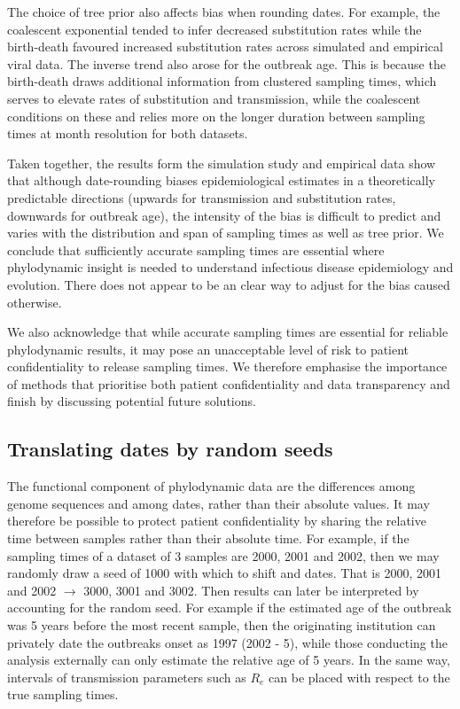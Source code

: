 \documentclass[12pt]{article}
\begin{document}
\begin{spacing}{2}
The choice of tree prior also affects bias when rounding dates. For example, the coalescent exponential tended to infer decreased substitution rates while the birth-death favoured increased substitution rates across simulated and empirical viral data. The inverse trend also arose for the outbreak age. This is because the birth-death draws additional information from clustered sampling times, which serves to elevate rates of substitution and transmission, while the coalescent conditions on these and relies more on the longer duration between sampling times at month resolution for both datasets. 

Taken together, the results form the simulation study and empirical data show that although date-rounding biases epidemiological estimates in a theoretically predictable directions (upwards for transmission and substitution rates, downwards for outbreak age), the intensity of the bias is difficult to predict and varies with the distribution and span of sampling times as well as tree prior. We conclude that sufficiently accurate sampling times are essential where phylodynamic insight is needed to understand infectious disease epidemiology and evolution. There does not appear to be an clear way to adjust for the bias caused otherwise. 

We also acknowledge that while accurate sampling times are essential for reliable phylodynamic results, it may pose an unacceptable level of risk to patient confidentiality to release sampling times. We therefore emphasise the importance of methods that prioritise both patient confidentiality and data transparency and finish by discussing potential future solutions.

\subsection*{Translating dates by random seeds}
The functional component of phylodynamic data are the differences among genome sequences and among dates, rather than their absolute values. It may therefore be possible to protect patient confidentiality by sharing the relative time between samples rather than their absolute time. For example, if the sampling times of a dataset of 3 samples are 2000, 2001 and 2002, then we may randomly draw a seed of 1000 with which to shift and dates. That is 2000, 2001 and 2002 $\rightarrow$ 3000, 3001 and 3002. Then results can later be interpreted by accounting for the random seed. For example if the estimated age of the outbreak was 5 years before the most recent sample, then the originating institution can privately date the outbreaks onset as 1997 (2002 - 5), while those conducting the analysis externally can only estimate the relative age of 5 years. In the same way, intervals of transmission parameters such as $R_e$ can be placed with respect to the true sampling times.


\end{spacing}
\end{document}
